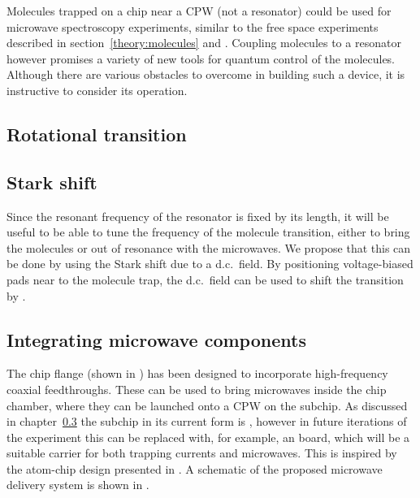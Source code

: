%
Molecules trapped on a chip near a CPW (not a resonator) could be used for
microwave spectroscopy experiments, similar to the free space experiments
described in section~\ref{theory:molecules} and
. Coupling molecules to a resonator however
promises a variety of new tools for quantum control of the molecules. Although
there are various obstacles to overcome in building such a device, it is
instructive to consider its operation. 

\subsection{Rotational transition}


\subsection{Stark shift}

Since the resonant frequency of the resonator is fixed by its length, it will
be useful to be able to tune the frequency of the molecule transition, either
to bring the molecules  or out of resonance with the microwaves. We
propose that this can be done by using the Stark shift due to a d.c.~field.
By positioning voltage-biased pads near to the molecule trap, the d.c.~field
can be used to shift the transition by .


\subsection{Integrating microwave components}

The chip flange (shown in ) has been
designed to incorporate high-frequency coaxial feedthroughs.  These can be used to bring microwaves inside the chip chamber,
where they can be launched onto a CPW on the subchip. As discussed in
chapter~\ref{} the subchip in its current form is ,
however in future iterations of the experiment this can be replaced with, for
example, an  board, which will be a suitable
carrier for both trapping currents and microwaves. This is inspired by the
atom-chip design presented in . A schematic of the proposed
microwave delivery system is shown in .


